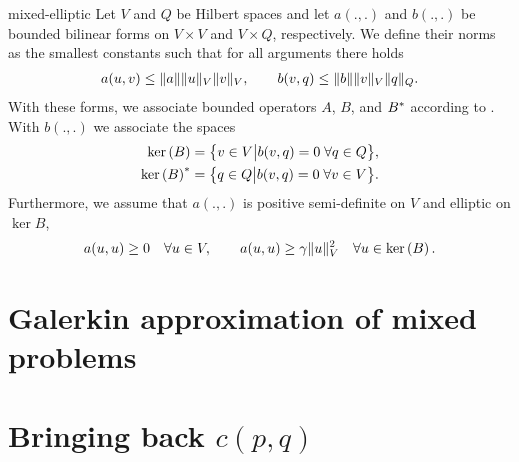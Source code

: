 \begin{Assumption}{mixed-elliptic}
  Let $V$ and $Q$ be Hilbert spaces and let $a(.,.)$ and $b(.,.)$ be
  bounded bilinear forms on $V\times V$ and $V\times Q$,
  respectively. We define their norms as the smallest constants such
  that for all arguments there holds
  \begin{gather}
    a(u,v) \le \lVert a\rVert \lVert u\rVert_V \lVert v\rVert_V,
    \qquad
    b(v,q) \le \lVert b\rVert \lVert v\rVert_V \lVert q\rVert_Q.
  \end{gather}
  With these forms, we associate bounded operators $A$, $B$, and $B^*$
  according to . With
  $b(.,.)$ we associate the spaces
  \begin{gather}
    \begin{split}
      \operatorname{ker}\left(B\right) &= \bigl\{v\in V \big| b(v,q) = 0 \;\forall q\in Q\bigr\},\\
      \operatorname{ker}\left(B\right)^* &= \bigl\{q\in Q \big| b(v,q) = 0 \;\forall v\in V\bigr\}.
    \end{split}
  \end{gather}
  Furthermore, we assume that $a(.,.)$ is positive semi-definite on
  $V$ and elliptic on $\ker B$,
  \begin{gather}
    a(u,u) \ge 0 \quad\forall u\in V,
    \qquad
    a(u,u) \ge \gamma \lVert u\rVert_V^2 \quad\forall u\in \operatorname{ker}\left(B\right).
  \end{gather}
\end{Assumption}

\section{Galerkin approximation of mixed problems}



\section{Bringing back $c(p,q)$}

